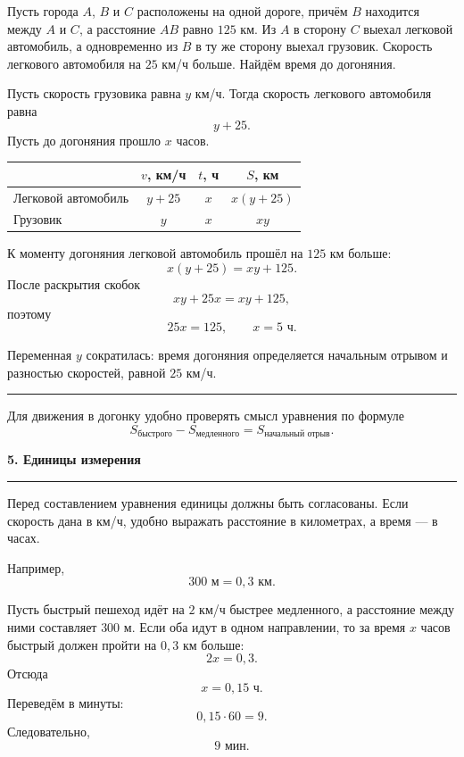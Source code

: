 \documentclass[a4paper,12pt]{article}
\newcommand{\sectiontitle}[1]{%
  \Needspace{6\baselineskip}%
  \vspace{0.25em}%
  {\Large\bfseries\color{darkaccent}#1}\par
  \vspace{0.25em}%
  \textcolor{rulegray}{\rule{\linewidth}{0.6pt}}%
  \vspace{0.35em}%
}
\newcommand{\important}[1]{%
  \par\vspace{0.2em}%
  \noindent
  \textcolor{accent}{\rule{2.4pt}{\baselineskip}}%
  \hspace{0.65em}%
  \begin{minipage}[t]{0.94\linewidth}
  #1
  \end{minipage}%
  \par\vspace{0.3em}%
}
\begin{document}
Пусть города \(A\), \(B\) и \(C\) расположены на одной дороге, причём \(B\) находится
между \(A\) и \(C\), а расстояние \(AB\) равно \(125\) км.
Из \(A\) в сторону \(C\) выехал легковой автомобиль, а одновременно из \(B\)
в ту же сторону выехал грузовик. Скорость легкового автомобиля на \(25\) км/ч больше.
Найдём время до догоняния.

Пусть скорость грузовика равна \(y\) км/ч. Тогда скорость легкового автомобиля равна
\[
y+25.
\]
Пусть до догоняния прошло \(x\) часов.

\begin{center}
\renewcommand{\arraystretch}{1.35}
\begin{tabular}{@{}lccc@{}}
\toprule
 & \(v\), км/ч & \(t\), ч & \(S\), км\\
\midrule
Легковой автомобиль & \(y+25\) & \(x\) & \(x(y+25)\)\\
Грузовик & \(y\) & \(x\) & \(xy\)\\
\bottomrule
\end{tabular}
\end{center}

К моменту догоняния легковой автомобиль прошёл на \(125\) км больше:
\[
x(y+25)=xy+125.
\]
После раскрытия скобок
\[
xy+25x=xy+125,
\]
поэтому
\[
25x=125,
\qquad
\boxed{x=5\text{ ч}}.
\]

Переменная \(y\) сократилась: время догоняния определяется начальным отрывом
и разностью скоростей, равной \(25\) км/ч.

\important{
Для движения в догонку удобно проверять смысл уравнения по формуле
\[
\boxed{S_{\text{быстрого}}-S_{\text{медленного}}
=S_{\text{начальный отрыв}}}.
\]
}

\sectiontitle{5. Единицы измерения}

Перед составлением уравнения единицы должны быть согласованы.
Если скорость дана в км/ч, удобно выражать расстояние в километрах, а время --- в часах.

Например,
\[
300\text{ м}=0{,}3\text{ км}.
\]

Пусть быстрый пешеход идёт на \(2\) км/ч быстрее медленного, а расстояние между ними
составляет \(300\) м. Если оба идут в одном направлении, то за время \(x\) часов
быстрый должен пройти на \(0{,}3\) км больше:
\[
2x=0{,}3.
\]
Отсюда
\[
x=0{,}15\text{ ч}.
\]
Переведём в минуты:
\[
0{,}15\cdot60=9.
\]
Следовательно,
\[
\boxed{9\text{ мин}}.
\]
\end{document}
